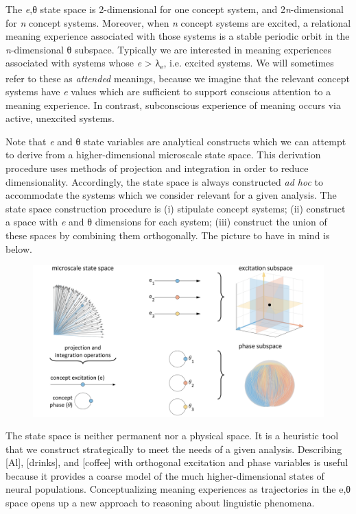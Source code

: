   The \textit{e},θ state space is 2-dimensional for one concept system, and 2\textit{n}{}-dimensional for \textit{n} concept systems. Moreover, when \textit{n} concept systems are excited, a relational meaning experience associated with those systems is a stable periodic orbit in the \textit{n}{}-dimensional θ subspace. Typically we are interested in meaning experiences associated with systems whose \textit{e} > λ\textsubscript{e}, i.e. excited systems. We will sometimes refer to these as \textit{attended} meanings, because we imagine that the relevant concept systems have \textit{e} values which are sufficient to support conscious attention to a meaning experience. In contrast, subconscious experience of meaning occurs via active, unexcited systems.

  Note that \textit{e} and θ state variables are analytical constructs which we can attempt to derive from a higher-dimensional microscale state space. This derivation procedure uses methods of projection and integration in order to reduce dimensionality. Accordingly, the state space is always constructed \textit{ad hoc} to accommodate the systems which we consider relevant for a given analysis. The state space construction procedure is (i) stipulate concept systems; (ii) construct a space with \textit{e} and θ dimensions for each system; (iii) construct the union of these spaces by combining them orthogonally. The picture to have in mind is below. 

  
\begin{figure}
\includegraphics[width=\textwidth]{figures/Tilsen-img14.png}
\caption{\missingcaption}
\label{fig:}
\end{figure}
 

  The state space is neither permanent nor a physical space. It is a heuristic tool that we construct strategically to meet the needs of a given analysis. Describing [Al], [drinks], and [coffee] with orthogonal excitation and phase variables is useful because it provides a coarse model of the much higher-dimensional states of neural populations. Conceptualizing meaning experiences as trajectories in the e,θ space opens up a new approach to reasoning about linguistic phenomena.

